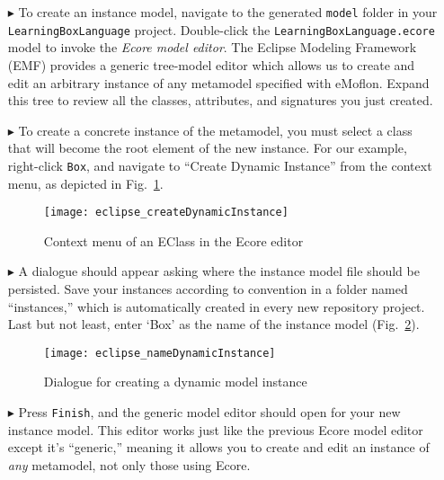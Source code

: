 \begin{itemize}

\item[$\blacktriangleright$] To create an instance model, navigate to the generated \texttt{model} folder in your \texttt{LearningBoxLanguage} project.
Double-click the \texttt{LearningBoxLa\-nguage.ecore} model to invoke  the \emph{Ecore model editor}. The Eclipse Modeling Framework (EMF) provides a generic
tree-model editor which allows us to create and edit an arbitrary instance of any metamodel specified with eMoflon. Expand this tree to review all the classes,
attributes, and signatures you just created.

\vspace{0.5cm}

\item[$\blacktriangleright$] To create a concrete instance of the metamodel, you must select a class that will become the root element of the new instance.
For our example, right-click \texttt{Box}, and navigate to ``Create Dynamic Instance'' from the context menu, as depicted in Fig.~\ref{fig:context_menu}.

\begin{figure}[htbp]
	\centering
  \texttt{[image: eclipse\_createDynamicInstance]}
	\caption{Context menu of an EClass in the Ecore editor}
	\label{fig:context_menu}
\end{figure}

\vspace{0.5cm}

\item[$\blacktriangleright$] A dialogue should appear asking where the instance model file should be persisted. Save your instances according to convention in a
folder named ``instances,'' which is automatically created in every new repository project. Last but not least, enter `Box' as the name of the instance model
(Fig.~\ref{fig:store_dynamic_instance}).

\vspace{0.5cm}

\begin{figure}[htbp]
	\centering
  \texttt{[image: eclipse\_nameDynamicInstance]}
	\caption{Dialogue for creating a dynamic model instance}
	\label{fig:store_dynamic_instance}
\end{figure}

\item[$\blacktriangleright$] Press \texttt{Finish}, and the generic model editor should open for your new instance model. This editor works just like the
previous Ecore model editor except it's ``generic,'' meaning it allows you to create and edit an instance of \emph{any} metamodel, not only those using Ecore.


\end{itemize}
